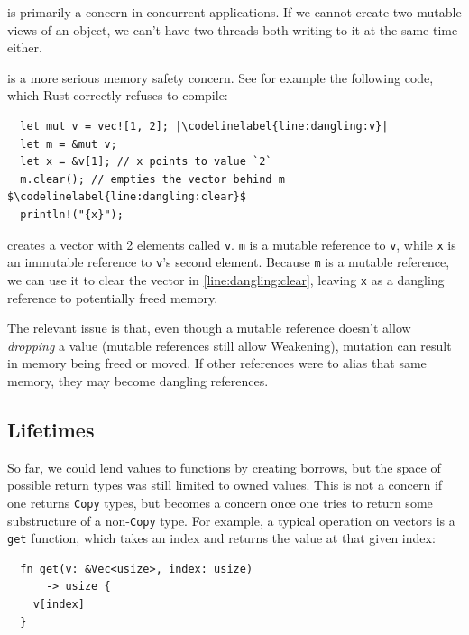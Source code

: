 \documentclass[sigplan,11pt,screen,nonacm]{acmart}
\newcommand*{\Copy}{\texttt{Copy}}
\newcounter{codeline}
\newcommand*{\codelinelabel}[1]{
  \refstepcounter{codeline}
  \setcounter{codeline}{\value{FancyVerbLine}}
  \label[codeline]{#1}
}
\begin{document}
 is primarily a concern in concurrent applications. If we cannot create two mutable views of an object, we can't have two threads both writing to it at the same time either.

 is a more serious memory safety concern. See for example the following code, which Rust correctly refuses to compile:
\begin{verbatim}
  let mut v = vec![1, 2]; |\codelinelabel{line:dangling:v}|
  let m = &mut v;
  let x = &v[1]; // x points to value `2`
  m.clear(); // empties the vector behind m $\codelinelabel{line:dangling:clear}$
  println!("{x}");
\end{verbatim}
 creates a vector with 2 elements called \texttt{v}. \texttt{m} is a mutable reference to \texttt{v}, while \texttt{x} is an immutable reference to \texttt{v}'s second element. Because \texttt{m} is a mutable reference, we can use it to clear the vector in \cref*{line:dangling:clear}, leaving \texttt{x} as a dangling reference to potentially freed memory.

The relevant issue is that, even though a mutable reference doesn't allow \emph{dropping} a value (mutable references still allow Weakening), mutation can result in memory being freed or moved. If other references were to alias that same memory, they may become dangling references.

\subsection{Lifetimes} \label{sec:rust:lifetimes}

So far, we could lend values to functions by creating borrows, but the space of possible return types was still limited to owned values. This is not a concern if one returns \Copy{} types, but becomes a concern once one tries to return some substructure of a non-\Copy{} type. For example, a typical operation on vectors is a \texttt{get} function, which takes an index and returns the value at that given index:
\begin{verbatim}
  fn get(v: &Vec<usize>, index: usize)
      -> usize {
    v[index]
  }
\end{verbatim}
\end{document}
